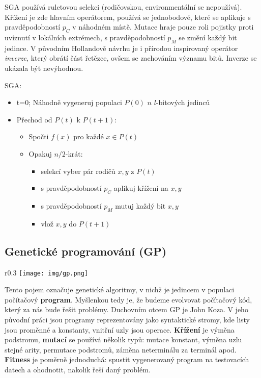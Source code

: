 SGA používá ruletovou selekci (rodičovskou, environmentální se nepoužívá). Křížení je zde hlavním operátorem, používá se jednobodové, které se aplikuje s pravděpodobností $p_C$ v náhodném místě. Mutace hraje pouze roli pojistky proti uvíznutí v lokálních extrémech, s pravděpodobností $p_M$ se změní každý bit jedince. V původním Hollandově návrhu je i přírodou inspirovaný operátor \textit{inverze}, který obrátí část řetězce, ovšem se zachováním významu bitů. Inverze se ukázala být nevýhodnou.

SGA:
\begin{itemize}
  \item t=0; Náhodně vygeneruj populaci $P(0)$ $n$ $l$-bitových jedinců
  \item Přechod od $P(t)$ k $P(t+1)$:
    \begin{itemize}
      \item Spočti $f(x)$ pro každé $x \in P(t)$
      \item Opakuj $n/2$-krát:
        \begin{itemize}
          \item selekcí vyber pár rodičů $x,y$ z $P(t)$
          \item s pravděpodobností $p_C$ aplikuj křížení na $x,y$
          \item s pravděpodobností $p_M$ mutuj každý bit $x,y$
          \item vlož $x,y$ do $P(t+1)$
        \end{itemize}
    \end{itemize}
\end{itemize}


\subsection{Genetické programování (GP)}
\begin{wrapfigure}{r}{0.3\textwidth}
\centering
\texttt{[image: img/gp.png]}
\end{wrapfigure}
Tento pojem označuje genetické algoritmy, v nichž je jedincem v populaci počítačový \textbf{program}. Myšlenkou tedy je, že budeme evolvovat počítačový kód, který za nás bude řešit problémy. Duchovním otcem GP je John Koza. V jeho původní práci jsou programy reprezentovány jako syntaktické stromy, kde listy jsou proměnné a konstanty, vnitřní uzly jsou operace. \textbf{Křížení} je výměna podstromu, \textbf{mutací} se používá několik typů: mutace konstant, výměna uzlu stejné arity, permutace podstromů, záměna neterminálu za terminál apod. \textbf{Fitness} je poměrně jednoduchá: spustit vygenerovaný program na testovacích datech a ohodnotit, nakolik řeší daný problém.

